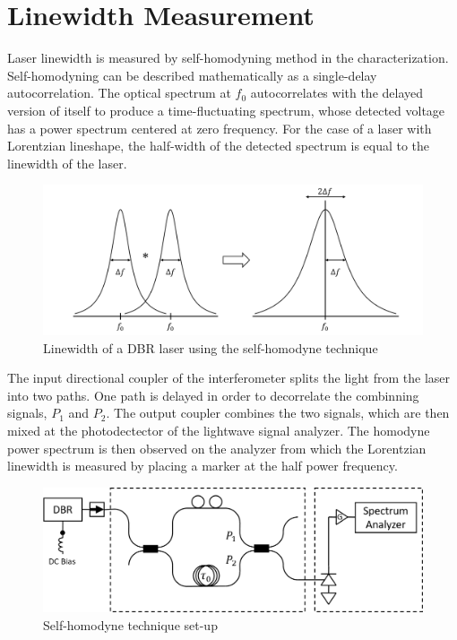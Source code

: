 \section{Linewidth Measurement}\label{sec:linewidth_measurement}
Laser linewidth is measured by self-homodyning method in the characterization. Self-homodyning can be described mathematically as a single-delay autocorrelation. The optical spectrum at $f_0$ autocorrelates with the delayed version of itself to produce a time-fluctuating spectrum, whose detected voltage has a power spectrum centered at zero frequency. For the case of a laser with Lorentzian lineshape, the half-width of the detected spectrum is equal to the linewidth of the laser.
\begin{figure}[ht]
    \centering
    \includegraphics[width=15cm]{figures/self-homodyne.png}
    \caption{Linewidth of a DBR laser using the self-homodyne technique}
    \label{self-homodyne}
\end{figure}

The input directional coupler of the interferometer splits the light from the laser into two paths. One path is delayed in order to decorrelate the combinning signals, $P_1$ and $P_2$. The output coupler combines the two signals, which are then mixed at the photodectector of the lightwave signal analyzer.  The homodyne power spectrum is then observed on the analyzer from which the Lorentzian linewidth is measured by placing a marker at the half power frequency.
\begin{figure}[ht]
    \centering
    \includegraphics[width=15cm]{figures/self-homodyne_setup.png}
    \caption{Self-homodyne technique set-up}
    \label{self-homodyne_setup}
\end{figure}

